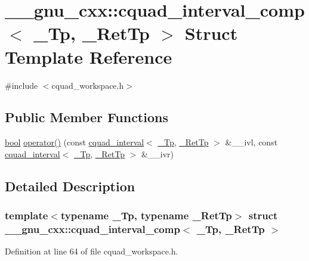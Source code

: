 \hypertarget{struct____gnu__cxx_1_1cquad__interval__comp}{}\section{\+\_\+\+\_\+gnu\+\_\+cxx\+:\+:cquad\+\_\+interval\+\_\+comp$<$ \+\_\+\+Tp, \+\_\+\+Ret\+Tp $>$ Struct Template Reference}
\label{struct____gnu__cxx_1_1cquad__interval__comp}


{\ttfamily \#include $<$cquad\+\_\+workspace.\+h$>$}

\subsection*{Public Member Functions}
\begin{DoxyCompactItemize}
\item 
\hyperlink{namespace____gnu__cxx_ae83aca57f97767d5d09188718728a0ac}{bool} \hyperlink{struct____gnu__cxx_1_1cquad__interval__comp_ac0a0d43bec114cb4d09639ae6b21085d}{operator()} (const \hyperlink{struct____gnu__cxx_1_1cquad__interval}{cquad\+\_\+interval}$<$ \hyperlink{namespace____gnu__cxx_a3b19a9c800ca194374ef9172290f7d79}{\+\_\+\+Tp}, \hyperlink{namespace____gnu__cxx_a886e03ece3d53ff7fa6c098a40f93fa5}{\+\_\+\+Ret\+Tp} $>$ \&\+\_\+\+\_\+ivl, const \hyperlink{struct____gnu__cxx_1_1cquad__interval}{cquad\+\_\+interval}$<$ \hyperlink{namespace____gnu__cxx_a3b19a9c800ca194374ef9172290f7d79}{\+\_\+\+Tp}, \hyperlink{namespace____gnu__cxx_a886e03ece3d53ff7fa6c098a40f93fa5}{\+\_\+\+Ret\+Tp} $>$ \&\+\_\+\+\_\+ivr)
\end{DoxyCompactItemize}


\subsection{Detailed Description}
\subsubsection*{template$<$typename \+\_\+\+Tp, typename \+\_\+\+Ret\+Tp$>$\newline
struct \+\_\+\+\_\+gnu\+\_\+cxx\+::cquad\+\_\+interval\+\_\+comp$<$ \+\_\+\+Tp, \+\_\+\+Ret\+Tp $>$}



Definition at line 64 of file cquad\+\_\+workspace.\+h.



